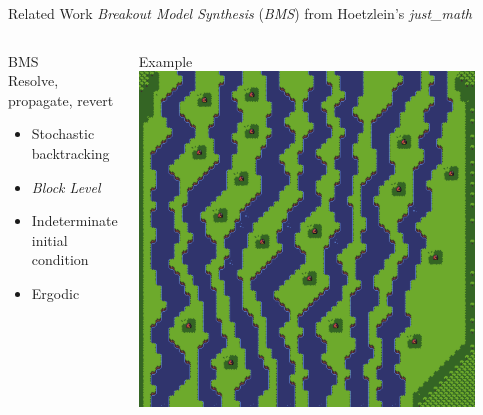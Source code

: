 \documentclass{beamer}
\begin{document}
  \begin{frame}[fragile]{Related Work}
    \textit{Breakout Model Synthesis} (\textit{BMS}) from Hoetzlein's \textit{just\_math}
    \begin{columns}[T,onlytextwidth]
        \begin{block}{BMS}
          \hfill \\
          Resolve, propagate, revert
          \begin{itemize}
            \item Stochastic backtracking
            \item \textit{Block Level}
            \item Indeterminate initial condition
            \item Ergodic
          \end{itemize}
        \end{block}
        \begin{block}{Example}
          \includegraphics[width=0.9\textwidth]{img/forestmicro_64x64.pdf}
        \end{block}
    \end{columns}
  \end{frame}
\end{document}
